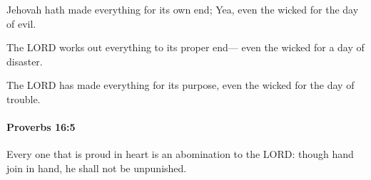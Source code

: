 			\begin{versebox}
					\item[BHS] 
					\item[ASV] Jehovah hath made everything for its own end; Yea, even the wicked for the day of evil.
					\item[NIV] The LORD works out everything to its proper end— even the wicked for a day of disaster.
					\item[NRSV] The LORD has made everything for its purpose, even the wicked for the day of trouble.
			\end{versebox}

		\paragraph{Proverbs 16:5} %
			\label{PROVERBS-16-5}

			Every one that is proud in heart is an abomination to the LORD: though hand join in hand, he shall not be unpunished.

